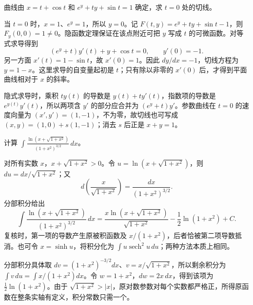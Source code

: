 \documentclass[12pt,fontset=fandol]{ctexart}
\begin{document}
\begin{example}\label{nm-2018-1b}
曲线由 $x=t+\cos t$ 和 $e^y+ty+\sin t=1$ 确定，求 $t=0$ 处的切线。
\end{example}
\begin{solve}
当 $t=0$ 时，$x=1$、$e^y=1$，所以 $y=0$。记 $F(t,y)=e^y+ty+\sin t-1$，则 $F_y(0,0)=1\ne0$。隐函数定理保证在该点附近可把 $y$ 写成 $t$ 的可微函数。对等式求导得到
\[
 (e^y+t)y'(t)+y+\cos t=0,
 \qquad y'(0)=-1.
\]
另一方面 $x'(t)=1-\sin t$，故 $x'(0)=1$。因此 $dy/dx=-1$，切线方程为 $y=1-x$。这里求导的自变量起初是 $t$；只有除以非零的 $x'(0)$ 后，才得到平面曲线相对于 $x$ 的斜率。

隐式求导时，乘积 $ty(t)$ 的导数是 $y(t)+ty'(t)$，指数项的导数是 $e^{y(t)}y'(t)$，所以两项含 $y'$ 的部分应合并为 $(e^y+t)y'$。参数曲线在 $t=0$ 的速度向量为 $(x',y')=(1,-1)$，不为零，故切线也可写成 $(x,y)=(1,0)+s(1,-1)$；消去 $s$ 后正是 $x+y=1$。

\end{solve}

\begin{example}\label{nm-2018-1c}
计算 $\displaystyle\int\frac{\ln(x+\sqrt{1+x^2})}{(1+x^2)^{3/2}}\,dx$。
\end{example}
\begin{solve}
对所有实数 $x$，$x+\sqrt{1+x^2}>0$。令 $u=\ln(x+\sqrt{1+x^2})$，则 $du=dx/\sqrt{1+x^2}$；又
\[
 d\left(\frac{x}{\sqrt{1+x^2}}\right)=\frac{dx}{(1+x^2)^{3/2}}.
\]
分部积分给出
\[
 \int\frac{\ln(x+\sqrt{1+x^2})}{(1+x^2)^{3/2}}\,dx
 =\frac{x\ln(x+\sqrt{1+x^2})}{\sqrt{1+x^2}}
 -\frac12\ln(1+x^2)+C.
\]
复核时，第一项的导数产生原被积函数及 $x/(1+x^2)$，后者恰被第二项导数抵消。也可令 $x=\sinh u$，将积分化为 $\int u\operatorname{sech}^2u\,du$；两种方法本质上相同。

分部积分具体取 $dv=(1+x^2)^{-3/2}dx$、$v=x/\sqrt{1+x^2}$，所以剩余积分为 $\int v\,du=\int x/(1+x^2)dx$。令 $w=1+x^2$，$dw=2x\,dx$，得到该项为 $\tfrac12\ln(1+x^2)$。由于 $\sqrt{1+x^2}>|x|$，原对数参数对每个实数都严格正，所得原函数在整条实轴有定义，积分常数只需一个。

\end{solve}
\end{document}
